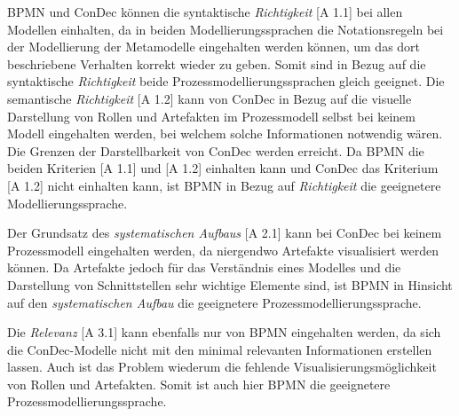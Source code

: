 {BPMN und ConDec können die syntaktische \textit{Richtigkeit} [A 1.1] bei allen Modellen einhalten, da in beiden Modellierungssprachen die Notationsregeln bei der Modellierung der Metamodelle eingehalten werden können, um das dort beschriebene Verhalten korrekt wieder zu geben. Somit sind in Bezug auf die syntaktische \textit{Richtigkeit} beide Prozessmodellierungssprachen gleich geeignet.\newline
Die semantische \textit{Richtigkeit} [A 1.2] kann von ConDec in Bezug auf die visuelle Darstellung von Rollen und Artefakten im Prozessmodell selbst bei keinem Modell eingehalten werden, bei welchem solche Informationen notwendig wären. Die Grenzen der Darstellbarkeit von ConDec  werden erreicht. \newline
Da BPMN die beiden Kriterien [A 1.1] und [A 1.2] einhalten kann und ConDec das Kriterium [A 1.2] nicht einhalten kann, ist BPMN in Bezug auf \textit{Richtigkeit} die geeignetere Modellierungssprache. \newline


Der  Grundsatz des \textit{systematischen Aufbaus} [A 2.1] kann bei ConDec bei keinem Prozessmodell eingehalten werden, da niergendwo Artefakte visualisiert werden können. Da Artefakte jedoch für das Verständnis eines Modelles und die Darstellung von Schnittstellen sehr wichtige Elemente sind, ist BPMN in Hinsicht auf den \textit{systematischen Aufbau} die geeignetere Prozessmodellierungssprache. \newline


Die \textit{Relevanz} [A 3.1] kann ebenfalls nur von BPMN eingehalten werden, da sich die ConDec-Modelle nicht mit den minimal relevanten Informationen erstellen lassen. Auch ist das Problem wiederum die fehlende Visualisierungsmöglichkeit von Rollen und Artefakten. Somit ist auch hier BPMN die geeignetere Prozessmodellierungssprache.\newline

}
